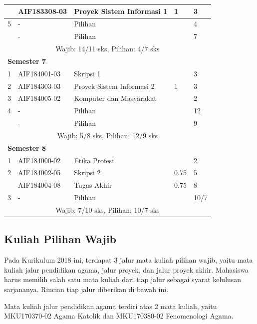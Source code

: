 \begin{table}[H]
\begin{tabular}{|p{0.5cm}|p{2.85cm}|p{4.95cm}|p{2.7cm}|p{2.7cm}|}
				& AIF183308-03 &	Proyek Sistem Informasi 1	& 1 &	3  \\ \hline
			5	& - &	Pilihan &	&	4  \\ \hline
				& - &	Pilihan	& &	7  \\ \hline
			\multicolumn{5}{|c|}{Wajib: 14/11 sks, Pilihan: 4/7 sks} \\ \hline
			\multicolumn{5}{|l|}{\textbf{Semester 7}} \\ \hline
			1	& AIF184001-03	& Skripsi 1	& &	3  \\ \hline
			2	& AIF184303-03	& Proyek Sistem Informasi 2 &	1 &	3  \\ \hline
			3	& AIF184005-02	& Komputer dan Masyarakat &	&	2  \\ \hline
			4	& - &	Pilihan	& &	12  \\ \hline
				& - &	Pilihan	& &	9  \\ \hline
			\multicolumn{5}{|c|}{Wajib: 5/8 sks, Pilihan: 12/9 sks} \\ \hline
			\multicolumn{5}{|l|}{\textbf{Semester 8}} \\ \hline
			1 &	AIF184000-02 &	Etika Profesi &	&	2  \\ \hline
			2 &	AIF184002-05 &	Skripsi 2 &	0.75 &	5  \\ \hline
			 & AIF184004-08 &	Tugas Akhir &	0.75 &	8  \\ \hline
			3 &	- &	Pilihan	&  &	10/7  \\ \hline
			\multicolumn{5}{|c|}{Wajib: 7/10 sks, Pilihan: 10/7 sks} \\ \hline
		\end{tabular}
	\label{tab:2_strukturkurikulum2018}
\end{table}

\subsection{Kuliah Pilihan Wajib}

Pada Kurikulum 2018 ini, terdapat 3 jalur mata kuliah pilihan wajib, yaitu mata kuliah jalur pendidikan agama, jalur proyek, dan jalur proyek akhir. Mahasiswa harus memilih salah satu mata kuliah dari tiap jalur sebagai syarat kelulusan sarjananya. Rincian tiap jalur diberikan di bawah ini.

Mata kuliah jalur pendidikan agama terdiri atas 2 mata kuliah, yaitu MKU170370-02 Agama Katolik dan MKU170380-02 Fenomenologi Agama.
 
